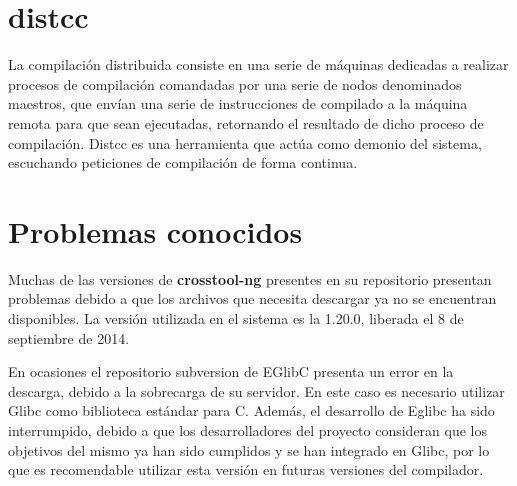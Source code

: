 \documentclass{article}
\begin{document}




\section{distcc}

La compilación distribuida consiste en una serie de máquinas dedicadas a realizar procesos de compilación comandadas por una serie de nodos denominados maestros, que envían una serie de instrucciones de compilado a la máquina remota para que sean ejecutadas, retornando el resultado de dicho proceso de compilación. Distcc es una herramienta que actúa como demonio del sistema, escuchando peticiones de compilación de forma continua.

\section{Problemas conocidos}

Muchas de las versiones de \textbf{crosstool-ng} presentes en su repositorio presentan problemas debido a que los archivos que necesita descargar ya no se encuentran disponibles. La versión utilizada en el sistema es la 1.20.0, liberada el 8 de septiembre de 2014.

En ocasiones el repositorio subversion de EGlibC presenta un error en la descarga, debido a la sobrecarga de su servidor. En este caso es necesario utilizar Glibc como biblioteca estándar para C. Además, el desarrollo de Eglibc ha sido interrumpido, debido a que los desarrolladores del proyecto consideran que los objetivos del mismo ya han sido cumplidos y se han integrado en Glibc, por lo que es recomendable utilizar esta versión en futuras versiones del compilador.


\end{document}
